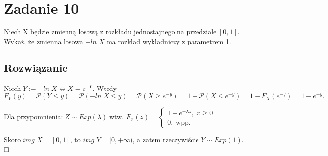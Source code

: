 \section{Zadanie 10}
Niech X będzie zmienną losową z rozkładu jednostajnego na przedziale \([0, 1]\). Wykaż, że zmienna losowa \(-ln\;X\) ma rozkład wykładniczy z parametrem 1.

\subsection*{Rozwiązanie}
Niech \(Y := -ln \; X \iff X = e^{-Y}\). Wtedy
\[
	F_Y(y) = \mathcal{P}(Y \le y) = \mathcal{P}(-ln\;X \le y) = \mathcal{P}(X \ge e^{-y}) = 1 - \mathcal{P}(X \le e^{-y}) = 1 - F_X(e^{-y}) = 1 - e^{-y}.
\]

Dla przypomnienia: \(Z \sim Exp(\lambda)\) wtw. \(F_Z(z) = \begin{cases} 1-e^{-\lambda z},\;x \ge 0 \\ 0, \text{ wpp.}\end{cases}\)

Skoro \(img\;X = [0, 1]\), to \(img\;Y = [0, +\infty)\), a zatem rzeczywiście \(Y \sim Exp(1)\). \(\hfill \square\)

